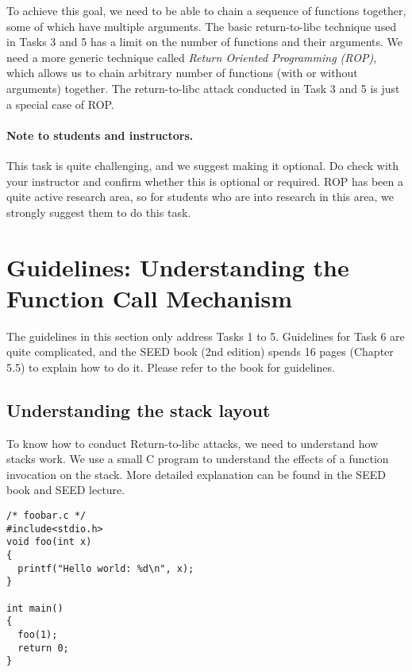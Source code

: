 To achieve this goal, we need to
be able to chain a sequence of functions together, some of which
have multiple arguments. The basic return-to-libc technique used in Tasks 3 
and 5 has a limit on the number of functions and their arguments. 
We need a more generic technique called 
\textit{Return Oriented Programming (ROP)}, which allows us to 
chain arbitrary number of functions (with or without arguments)
together. The return-to-libc attack conducted in Task 3 and 5 
is just a special case of ROP. 


\paragraph{Note to students and instructors.}
This task is quite challenging, and we suggest making it optional. Do check with
your instructor and confirm whether this is optional or required. 
ROP has been a quite active research area, so for students who are into
research in this area, we strongly suggest them to do this task.  



\section{Guidelines: Understanding the Function Call Mechanism}

The guidelines in this section only address Tasks 1 to 5. 
Guidelines for Task 6 are quite complicated, 
and the SEED book (2nd edition) spends 16 pages (Chapter 5.5) 
to explain how to do it. Please refer to the book for guidelines. 


\subsection{Understanding the stack layout}

To know how to conduct Return-to-libc attacks, we need to 
understand how stacks work.  We use a small C program to understand 
the effects of a function invocation on the stack. More detailed 
explanation can be found in the SEED book and SEED lecture. 


\begin{lstlisting}
/* foobar.c */
#include<stdio.h>
void foo(int x)
{
  printf("Hello world: %d\n", x);
}

int main()
{
  foo(1);
  return 0;
}
\end{lstlisting}

